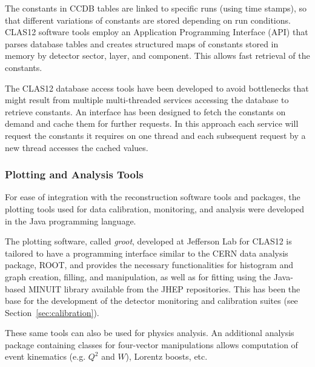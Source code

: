 The constants in CCDB tables are linked  to specific runs (using time stamps), so that different variations of
constants are stored depending on run conditions. CLAS12 software tools employ an Application Programming
Interface (API) that parses database tables and creates structured maps of constants stored in  memory by
detector sector, layer, and component. This allows fast retrieval of the constants.

The CLAS12 database access tools have been developed to avoid bottlenecks that might result from multiple
multi-threaded services accessing the database to retrieve constants.  An interface has been designed to fetch
the constants on demand and cache them for further requests. In this approach each service will request the
constants it requires on one thread and each subsequent request by a new thread accesses
the cached values.

\subsubsection{Plotting and Analysis Tools}

For ease of integration with the reconstruction software tools and packages, the plotting tools used for data
calibration, monitoring, and analysis were developed in the Java programming language.

The plotting software, called {\it groot}, developed at Jefferson Lab for CLAS12 is tailored to have a programming
interface similar to the CERN data analysis package, ROOT, and provides the necessary functionalities for
histogram and graph creation, filling, and manipulation, as well as for fitting using the Java-based MINUIT library
available from the JHEP repositories. This has been the base for the development of the detector monitoring and
calibration suites (see Section~\ref{sec:calibration}).

These same tools can also be used for physics analysis. An additional analysis package containing classes for
four-vector manipulations allows computation of event kinematics (e.g. $Q^2$ and $W$), Lorentz boosts, etc. 

